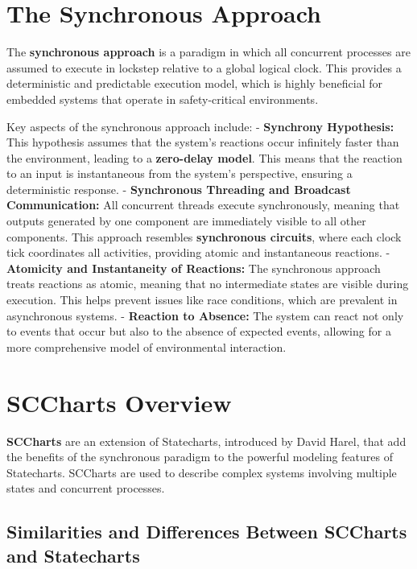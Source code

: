 \documentclass[
  14pt,
  a4paper,
  DIV=11,
  numbers=noendperiod,
  headinclude=true,
  footinclude=true]{scrreprt}
\begin{document}
\section{The Synchronous Approach}\label{the-synchronous-approach}

The \textbf{synchronous approach} is a paradigm in which all concurrent
processes are assumed to execute in lockstep relative to a global
logical clock. This provides a deterministic and predictable execution
model, which is highly beneficial for embedded systems that operate in
safety-critical environments.

Key aspects of the synchronous approach include: - \textbf{Synchrony
Hypothesis:} This hypothesis assumes that the system's reactions occur
infinitely faster than the environment, leading to a \textbf{zero-delay
model}. This means that the reaction to an input is instantaneous from
the system's perspective, ensuring a deterministic response. -
\textbf{Synchronous Threading and Broadcast Communication:} All
concurrent threads execute synchronously, meaning that outputs generated
by one component are immediately visible to all other components. This
approach resembles \textbf{synchronous circuits}, where each clock tick
coordinates all activities, providing atomic and instantaneous
reactions. - \textbf{Atomicity and Instantaneity of Reactions:} The
synchronous approach treats reactions as atomic, meaning that no
intermediate states are visible during execution. This helps prevent
issues like race conditions, which are prevalent in asynchronous
systems. - \textbf{Reaction to Absence:} The system can react not only
to events that occur but also to the absence of expected events,
allowing for a more comprehensive model of environmental interaction.

\section{SCCharts Overview}\label{sccharts-overview}

\textbf{SCCharts} are an extension of Statecharts, introduced by David
Harel, that add the benefits of the synchronous paradigm to the powerful
modeling features of Statecharts. SCCharts are used to describe complex
systems involving multiple states and concurrent processes.

\subsection{Similarities and Differences Between SCCharts and
Statecharts}\label{similarities-and-differences-between-sccharts-and-statecharts}
\end{document}
